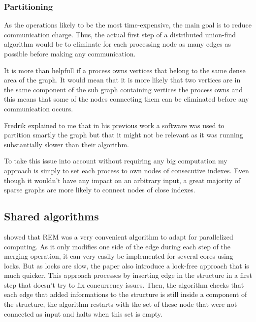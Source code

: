 \documentclass[12px]{article}
\begin{document}
      \subsubsection{Partitioning}
        As the operations likely to be the most time-expensive, the main goal is to reduce communication charge.
        Thus, the actual first step of a distributed union-find algorithm would be to eliminate for each processing node as many edges as possible before making any communication.

        It is more than helpfull if a process owns vertices that belong to the same dense area of the graph.
        It would mean that it is more likely that two vertices are in the same component of the sub graph containing vertices the process owns and this means that some of the nodes connecting them can be eliminated before any communication occurs.

        Fredrik explained to me that in his previous work a software was used to partition smartly the graph but that it might not be relevant as it was running substantially slower than their algorithm.

        To take this issue into account without requiring any big computation my approach is simply to set each process to own nodes of consecutive indexes. Even though it wouldn't have any impact on an arbitrary input, a great majority of sparse graphs are more likely to connect nodes of close indexes.

    \subsection{Shared algorithms}
       showed that REM was a very convenient algorithm to adapt for parallelized computing. As it only modifies one side of the edge during each step of the merging operation, it can very easily be implemented for several cores using locks.
      But as locks are slow, the paper also introduce a lock-free approach that is much quicker. This approach processes by inserting edge in the structure in a first step that doesn't try to fix concurrency issues. Then, the algorithm checks that each edge that added informations to the structure is still inside a component of the structure, the algorithm restarts with the set of these node that were not connected as input and halts when this set is empty.
\end{document}
